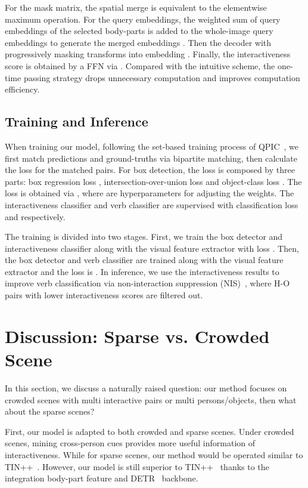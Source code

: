 \documentclass[runningheads]{llncs}
\begin{document}
For the mask matrix, the spatial merge is equivalent to the elementwise maximum operation. 
For the query embeddings, the weighted sum of query embeddings  of the selected body-parts is added to the whole-image query embeddings  to generate the merged embeddings . Then the decoder  with progressively masking transforms  into embedding .
Finally, the interactiveness score is obtained by a FFN via .
Compared with the intuitive scheme, the one-time passing strategy drops unnecessary computation and improves computation efficiency. 

\subsection{Training and Inference}
When training our model, following the set-based training process of QPIC~\cite{qpic}, we first match predictions and ground-truths via bipartite matching, then calculate the loss for the matched pairs.
For box detection, the loss is composed by three parts: box regression loss , intersection-over-union loss  and object-class loss . The loss  is obtained via , where  are hyperparameters for adjusting the weights.
The interactiveness classifier and verb classifier are supervised with classification loss  and  respectively.

The training is divided into two stages. First, we train the box detector and interactiveness classifier along with the visual feature extractor with loss . Then, the box detector and verb classifier are trained along with the visual feature extractor and the loss is . 
In inference, we use the interactiveness results to improve verb classification via non-interaction suppression (NIS)~\cite{li2021transferable}, where H-O pairs with lower interactiveness scores are filtered out.

\section{Discussion: Sparse vs. Crowded Scene}

In this section, we discuss a naturally raised question: our method focuses on crowded scenes with multi interactive pairs or multi persons/objects, then what about the sparse scenes?

First, our model is adapted to both crowded and sparse scenes. Under crowded scenes, mining cross-person cues provides more useful information of interactiveness. While for sparse scenes, our method would be operated similar to TIN++~\cite{li2021transferable}. 
However, our model is still superior to TIN++~\cite{li2021transferable} thanks to the integration body-part feature and DETR~\cite{detr} backbone.
\end{document}
